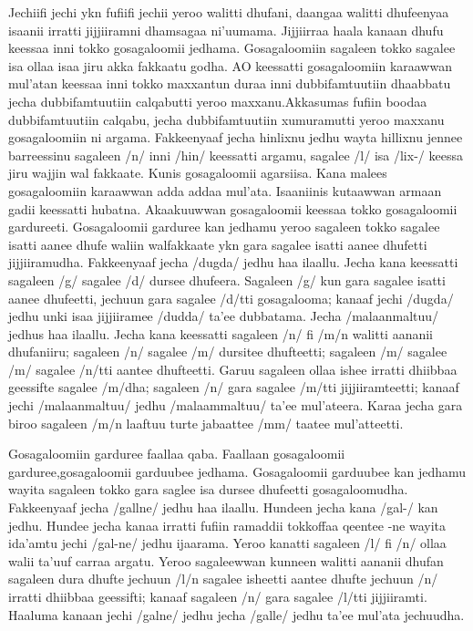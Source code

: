 \documentclass[11pt,b5paper]{book}
\begin{document}
\begin{itemize}
Jechiifi jechi ykn fufiifi jechii yeroo walitti dhufani, daangaa  walitti dhufeenyaa isaanii irratti jijjiiramni dhamsagaa  ni’uumama. Jijjiirraa haala kanaan dhufu keessaa inni tokko  gosagaloomii jedhama. Gosagaloomiin sagaleen tokko sagalee  isa ollaa isaa jiru akka fakkaatu godha. AO keessatti  gosagaloomiin karaawwan mul’atan keessaa inni tokko  maxxantun duraa inni dubbifamtuutiin dhaabbatu jecha  dubbifamtuutiin calqabutti yeroo maxxanu.Akkasumas fufiin  boodaa dubbifamtuutiin calqabu, jecha dubbifamtuutiin  xumuramutti yeroo maxxanu gosagaloomiin ni  argama. Fakkeenyaaf jecha hinlixnu jedhu wayta hillixnu  jennee barreessinu sagaleen /n/ inni /hin/ keessatti argamu,  sagalee /l/ isa /lix-/ keessa jiru wajjin wal fakkaate. Kunis  gosagaloomii agarsiisa. Kana malees gosagaloomiin karaawwan  adda addaa mul'ata. Isaaniinis kutaawwan armaan gadii  keessatti hubatna. Akaakuuwwan gosagaloomii keessaa tokko gosagaloomii  gardureeti. Gosagaloomii garduree kan jedhamu yeroo sagaleen  tokko sagalee isatti aanee dhufe waliin walfakkaate ykn gara sagalee isatti aanee dhufetti jijjiiramudha. Fakkeenyaaf jecha /dugda/ jedhu haa ilaallu. Jecha kana keessatti sagaleen /g/ sagalee /d/ dursee dhufeera. Sagaleen /g/ kun gara sagalee isatti aanee dhufeetti, jechuun gara sagalee /d/tti gosagalooma; kanaaf jechi /dugda/ jedhu unki isaa jijjiiramee /dudda/ ta'ee dubbatama. Jecha /malaanmaltuu/ jedhus haa ilaallu. Jecha kana keessatti sagaleen /n/ fi /m/n walitti aananii dhufaniiru; sagaleen /n/ sagalee /m/ dursitee dhufteetti; sagaleen /m/ sagalee /m/ sagalee /n/tti aantee dhufteetti. Garuu sagaleen ollaa ishee irratti dhiibbaa geessifte sagalee /m/dha; sagaleen /n/ gara sagalee /m/tti jijjiiramteetti; kanaaf jechi /malaanmaltuu/ jedhu /malaammaltuu/ ta'ee mul'ateera. Karaa jecha gara biroo sagaleen /m/n laaftuu turte jabaattee /mm/ taatee mul'atteetti.

Gosagaloomiin garduree faallaa qaba. Faallaan gosagaloomii garduree,gosagaloomii garduubee jedhama. Gosagaloomii garduubee kan jedhamu wayita  sagaleen tokko gara saglee isa dursee dhufeetti  gosagaloomudha. Fakkeenyaaf jecha /gallne/ jedhu haa ilaallu. Hundeen jecha kana /gal-/ kan jedhu. Hundee jecha kanaa irratti fufiin ramaddii tokkoffaa qeentee {-ne} wayita ida'amtu jechi /gal-ne/ jedhu ijaarama. Yeroo kanatti sagaleen /l/ fi /n/ ollaa walii ta'uuf carraa argatu. Yeroo sagaleewwan kunneen walitti aananii dhufan sagaleen dura dhufte jechuun /l/n sagalee isheetti aantee dhufte jechuun /n/ irratti dhiibbaa geessifti; kanaaf sagaleen /n/ gara sagalee /l/tti jijjiiramti. Haaluma kanaan jechi /galne/ jedhu jecha /galle/ jedhu ta'ee mul'ata jechuudha.


\end{itemize}
\end{document}

